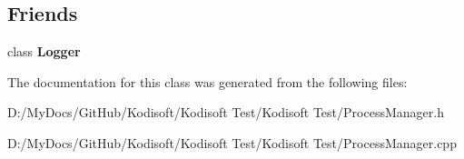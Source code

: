 \subsection*{Friends}
\begin{DoxyCompactItemize}
\item 
\hypertarget{class_process_manager_aff02b76416d2846736b7ecd798921a0a}{class {\bfseries Logger}}\label{class_process_manager_aff02b76416d2846736b7ecd798921a0a}

\end{DoxyCompactItemize}


The documentation for this class was generated from the following files\+:\begin{DoxyCompactItemize}
\item 
D\+:/\+My\+Docs/\+Git\+Hub/\+Kodisoft/\+Kodisoft Test/\+Kodisoft Test/Process\+Manager.\+h\item 
D\+:/\+My\+Docs/\+Git\+Hub/\+Kodisoft/\+Kodisoft Test/\+Kodisoft Test/Process\+Manager.\+cpp\end{DoxyCompactItemize}
